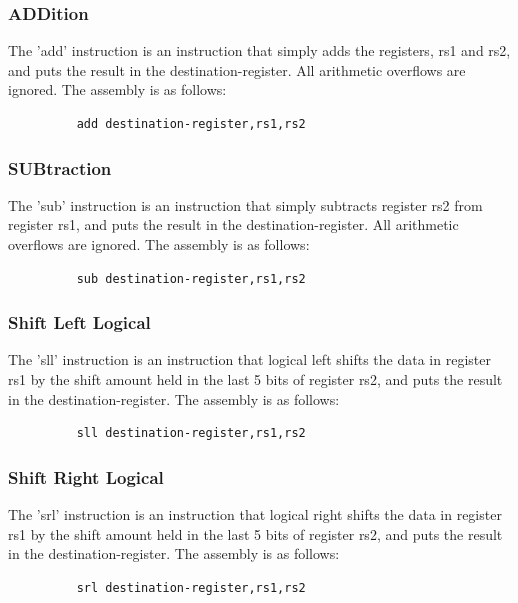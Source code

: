\subsubsection{ADDition}
\qquad
The 'add' instruction is an instruction that simply adds the registers, rs1 and rs2, and puts the result in the destination-register. All arithmetic overflows are ignored. The assembly is as follows:
\begin{figure}[!htbp]
    \centering
    \begin{verbatim}
    add destination-register,rs1,rs2
    \end{verbatim}
\end{figure}\newline

\subsubsection{SUBtraction}
\qquad
The 'sub' instruction is an instruction that simply subtracts register rs2 from register rs1, and puts the result in the destination-register. All arithmetic overflows are ignored. The assembly is as follows:
\begin{figure}[!htbp]
    \centering
    \begin{verbatim}
    sub destination-register,rs1,rs2
    \end{verbatim}
\end{figure}\newline

\subsubsection{Shift Left Logical}
\qquad
The 'sll' instruction is an instruction that logical left shifts the data in register rs1 by the shift amount held in the last 5 bits of register rs2, and puts the result in the destination-register. The assembly is as follows:
\begin{figure}[!htbp]
    \centering
    \begin{verbatim}
    sll destination-register,rs1,rs2
    \end{verbatim}
\end{figure}\newline

\subsubsection{Shift Right Logical}
\qquad
The 'srl' instruction is an instruction that logical right shifts the data in register rs1 by the shift amount held in the last 5 bits of register rs2, and puts the result in the destination-register. The assembly is as follows:
\begin{figure}[!htbp]
    \centering
    \begin{verbatim}
    srl destination-register,rs1,rs2
    \end{verbatim}
\end{figure}\newline

